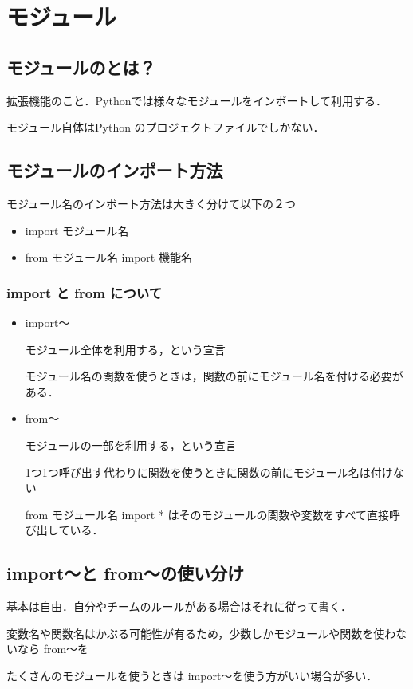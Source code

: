 \documentclass{jsarticle}
\begin{document}

\section{モジュール}
\subsection{モジュールのとは？}
拡張機能のこと．Pythonでは様々なモジュールをインポートして利用する． \par
モジュール自体はPython のプロジェクトファイルでしかない．
\subsection{モジュールのインポート方法}
モジュール名のインポート方法は大きく分けて以下の２つ
\begin{itemize}
	\item{import モジュール名}
	\item{from モジュール名 import 機能名}
\end{itemize}
\subsubsection{import と from について}
\begin{itemize}
	\item{import～} \par
	モジュール全体を利用する，という宣言 \par
	モジュール名の関数を使うときは，関数の前にモジュール名を付ける必要がある．
	\item{from～} \par
	モジュールの一部を利用する，という宣言 \par
	1つ1つ呼び出す代わりに関数を使うときに関数の前にモジュール名は付けない \par
	from モジュール名 import * はそのモジュールの関数や変数をすべて直接呼び出している．
\end{itemize}

\subsection{import～と from～の使い分け}
基本は自由．自分やチームのルールがある場合はそれに従って書く．\par
変数名や関数名はかぶる可能性が有るため，少数しかモジュールや関数を使わないなら from～を \par
たくさんのモジュールを使うときは import～を使う方がいい場合が多い．
\end{document}
